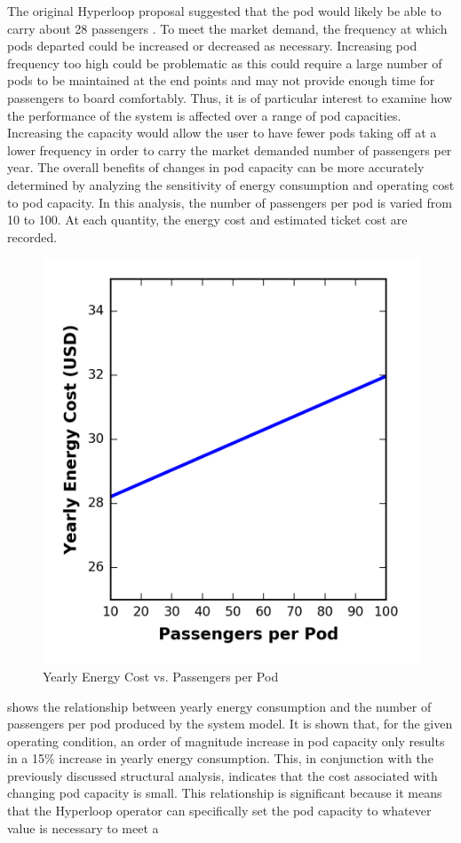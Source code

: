 The original Hyperloop proposal suggested
that the pod would likely be able to carry about 28 passengers \cite{Musk}.
To meet the market demand, the frequency at which pods departed could be
increased or decreased as necessary. Increasing pod frequency too high could be
problematic as this could require a large number of pods to be maintained at
the end points and may not provide enough time for passengers to board comfortably.
Thus, it is of particular interest to examine how the performance of the system
is affected over a range of pod capacities. Increasing the capacity would allow
the user to have fewer pods taking off at a lower frequency in order to carry
the market demanded number of passengers per year. The overall benefits of
changes in pod capacity can be more accurately determined by analyzing the
sensitivity of energy consumption and operating cost to pod capacity.
In this analysis, the number of passengers per pod is varied from 10 to 100.
At each quantity, the energy cost and estimated ticket cost are recorded.
\begin{figure}
	\centering
	\includegraphics[width=.45\textwidth]{../../images/graphs/capacity_trades/passengers_vs_energy.png}
	\caption{Yearly Energy Cost vs. Passengers per Pod}
	\label{fig:energy_cost_vs_passengers}
\end{figure}
 shows the relationship between yearly
energy consumption and the number of passengers per pod produced by the system model.
It is shown that, for the given operating condition, an order of magnitude
increase in pod capacity only results in a 15\% increase in yearly energy consumption.
This, in conjunction with the previously discussed structural analysis,
indicates that the cost associated with changing pod capacity is small.
This relationship is significant because it means that the Hyperloop operator
can specifically set the pod capacity to whatever value is necessary to meet a
